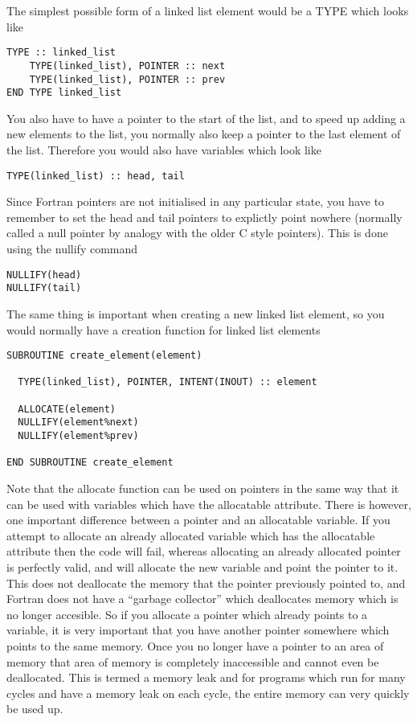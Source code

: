 \documentclass[12pt,a4paper]{article}
\newcommand{\simpleboxverbatim}{\begin{Verbatim}[obeytabs=true,frame=single,
  framerule=0.5mm,rulecolor=\color{warwickmid},formatcom=\color{black}]}
\begin{document}
The simplest possible form of a linked list element would be a TYPE which
looks like

\simpleboxverbatim
TYPE :: linked_list
    TYPE(linked_list), POINTER :: next
    TYPE(linked_list), POINTER :: prev
END TYPE linked_list
\end{Verbatim}

You also have to have a pointer to the start of the list, and to speed up
adding a new elements to the list, you normally also keep a pointer to the
last element of the list. Therefore you would also have variables which look
like
\simpleboxverbatim
TYPE(linked_list) :: head, tail
\end{Verbatim}

Since Fortran pointers are not initialised in any particular state, you have
to remember to set the head and tail pointers to explictly point nowhere
(normally called a null pointer by analogy with the older C style
pointers). This is done using the nullify command
\simpleboxverbatim
NULLIFY(head)
NULLIFY(tail)
\end{Verbatim}

The same thing is important when creating a new linked list element, so you
would normally have a creation function for linked list elements

\simpleboxverbatim
SUBROUTINE create_element(element)

  TYPE(linked_list), POINTER, INTENT(INOUT) :: element

  ALLOCATE(element)
  NULLIFY(element%
  NULLIFY(element%

END SUBROUTINE create_element
\end{Verbatim}
Note that the allocate function can be used on pointers in the same way that
it can be used with variables which have the allocatable attribute. There is
however, one important difference between a pointer and an allocatable
variable. If you attempt to allocate an already allocated variable which has
the allocatable attribute then the code will fail, whereas allocating an
already allocated pointer is perfectly valid, and will allocate the new
variable and point the pointer to it. This does not deallocate the memory that
the pointer previously pointed to, and Fortran does not have a ``garbage
collector'' which deallocates memory which is no longer accesible. So if you
allocate a pointer which already points to a variable, it is very important
that you have another pointer somewhere which points to the same memory. Once
you no longer have a pointer to an area of memory that area of memory is
completely inaccessible and cannot even be deallocated. This is termed a
memory leak and for programs which run for many cycles and have a memory leak
on each cycle, the entire memory can very quickly be used up.
\end{document}
